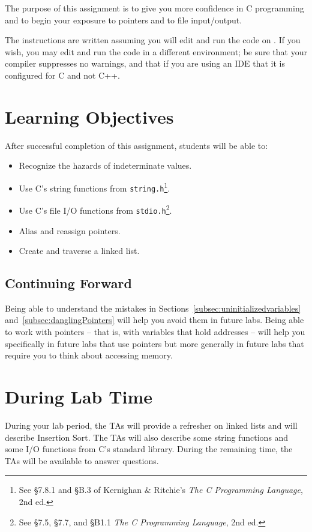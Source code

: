 The purpose of this assignment is to give you more confidence in C programming and to begin your exposure to pointers and to file input/output.

The instructions are written assuming you will edit and run the code on \runtimeenvironment.
If you wish, you may edit and run the code in a different environment;
be sure that your compiler suppresses no warnings, and that if you are using an IDE that it is configured for C and not C++.

\section*{Learning Objectives}

After successful completion of this assignment, students will be able to:
\begin{itemize}
    \item Recognize the hazards of indeterminate values.
    \item Use C's string functions from \lstinline{string.h}\footnote{\label{note:stringFunctions}See \S7.8.1 and \S{}B.3 of Kernighan \& Ritchie's \textit{The C Programming Language}, 2nd ed.}.
    \item Use C's file I/O functions from \lstinline{stdio.h}\footnote{See \S7.5, \S7.7, and \S{}B1.1 \textit{The C Programming Language}, 2nd ed.}.
    \item Alias and reassign pointers.
    \item Create and traverse a linked list.
\end{itemize}

\subsection*{Continuing Forward}

Being able to understand the mistakes in Sections~\ref{subsec:uninitializedvariables} and~\ref{subsec:danglingPointers} will help you avoid them in future labs.
Being able to work with pointers -- that is, with variables that hold addresses -- will help you specifically in future labs that use pointers but more generally in future labs that require you to think about accessing memory.

\section*{During Lab Time}

During your lab period, the TAs will provide a refresher on linked lists and will describe Insertion Sort.
The TAs will also describe some string functions and some I/O functions from C's standard library.
During the remaining time, the TAs will be available to answer questions.

